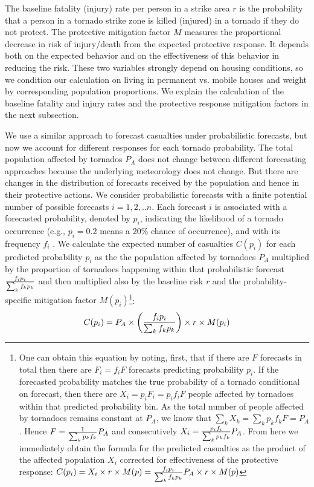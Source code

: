 \documentclass{ametsocV6.1}
\newcommand{\add}[1]{{\color{red}#1}}
\begin{document}
The baseline fatality (injury) rate per person in a strike area $r$ is the probability that a person in a tornado strike zone is killed (injured) in a tornado if they do not protect. The protective mitigation factor \add{$M$} measures the proportional decrease in risk of injury/death from the expected protective response. It depends both on the expected behavior and on the effectiveness of this behavior in reducing the risk. These two variables strongly depend on housing conditions, so we condition our calculation on living in permanent vs. mobile houses and weight by corresponding population proportions. We explain the calculation of the baseline fatality and injury rates and the protective response mitigation factors in the next subsection.

We use a similar approach to forecast casualties under probabilistic forecasts, but now we account for different responses for each tornado probability.  The total population affected by tornados $P_A$ does not change between different forecasting approaches because the underlying meteorology does not change. But there are changes in the distribution of forecasts received by the population and hence in their protective actions. \add{We consider probabilistic forecasts with a finite potential number of possible forecasts $i=1,2,..n$. Each forecast $i$ is associated with a forecasted probability, denoted by $p_i$, indicating the likelihood of a tornado occurrence (e.g., $p_i=0.2$ means a 20\% chance of occurrence), and with its frequency $f_i$ . We calculate the expected number of casualties $C(p_i)$ for each predicted probability $p_i$ as the the population affected by tornadoes $P_A$ multiplied by the proportion of tornadoes happening within that probabilistic forecast ${f_ip_i\over \sum_k f_k p_k}$ and then multiplied also by the baseline risk $r$ and the probability-specific mitigation factor $M(p_i)$}\footnote{\add{One can obtain this equation by noting, first, that if there are $F$ forecasts in total then there are $F_i=f_i F$ forecasts predicting probability $p_i$. If the forecasted probability matches the true probability of a tornado conditional on forecast, then there are $X_i=p_i F_i=p_i f_i F$ people affected by tornadoes within that predicted probability bin. As the total number of people affected by tornadoes remains constant at $P_A$, we know that $\sum_kX_k=\sum_kp_kf_kF=P_A$. Hence $F={1\over \sum_k p_kf_k}P_A$ and consecutively $X_i={p_if_i\over \sum_k p_kf_k}P_A$. From here we immediately obtain the formula for the predicted casualties as the product of the affected population $X_i$ corrected for effectiveness of the protective response: $C(p_i)=X_i\times r \times M(p)={f_i p_i\over \sum_k f_k p_k} P_A \times r \times M(p)$}}:
\begin{equation}
C(p_i) = P_A \times \left({f_i p_i\over \sum_k f_k p_k}\right)  \times r \times M(p_i)
\end{equation}
\end{document}
